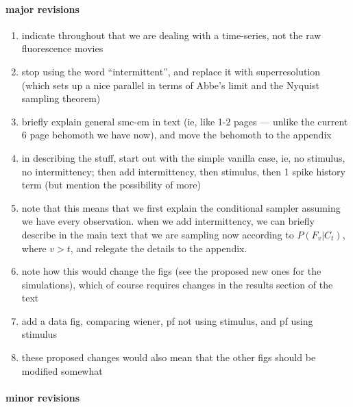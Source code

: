 \documentclass{article}
\begin{document}
\paragraph{major revisions}

\begin{enumerate}
\item indicate throughout that we are dealing with a time-series, not the raw fluorescence movies
\item stop using the word ``intermittent'', and replace it with superresolution (which sets up a nice parallel in terms of Abbe's limit and the Nyquist sampling theorem)
\item briefly explain general smc-em in text (ie, like 1-2 pages --- unlike the current 6 page behomoth we have now), and move the behomoth to the appendix
\item in describing the stuff, start out with the simple vanilla case, ie, no stimulus, no intermittency; then add intermittency, then stimulus, then 1 spike history term (but mention the possibility of more)
\item note that this means that we first explain the conditional sampler assuming we have every observation.  when we add intermittency, we can briefly describe in the main text that we are sampling now according to $P(F_v | C_t)$, where $v>t$, and relegate the details to the appendix.
\item note how this would change the figs (see the proposed new ones for the simulations), which of course requires changes in the results section of the text
\item add a data fig, comparing wiener, pf not using stimulus, and pf using stimulus
\item these proposed changes would also mean that the other figs should be modified somewhat
\end{enumerate}


\paragraph{minor revisions}
\end{document}
